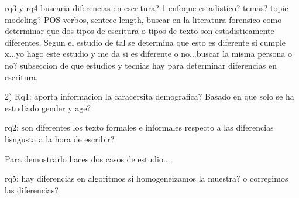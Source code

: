 rq3 y rq4 buscaria diferencias en escritura? 1 enfoque estadistico? temas? topic modeling? POS verbos, sentece length,
buscar en la literatura forensico como determinar que dos tipos de escritura o tipos de texto son estadisticamente diferentes. Segun el estudio de tal se determina que esto es diferente si cumple x...yo hago este estudio y me da si es diferente o no...buscar la misma persona o no? subseccion de que estudios y tecnias hay para determinar diferencias en escritura.

2) Rq1: aporta informacion la caracersita demografica? Basado en que solo se ha estudiado gender y age?

rq2: son diferentes los texto formales e informales respecto a las diferencias lisngusta a la hora de escribir?

Para demostrarlo haces dos casos de estudio....

rq5: hay diferencias en algoritmos si homogeneizamos la muestra? o corregimos las diferencias? 